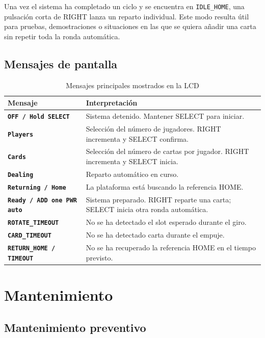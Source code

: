 \documentclass[a4paper, 11pt]{article}
\begin{document}
Una vez el sistema ha completado un ciclo y se encuentra en \texttt{IDLE\_HOME}, una pulsación corta de RIGHT lanza un reparto individual. Este modo resulta útil para pruebas, demostraciones o situaciones en las que se quiera añadir una carta sin repetir toda la ronda automática.

\subsection{Mensajes de pantalla}

\begin{table}[H]
\centering
\small
\begin{tabularx}{\textwidth}{>{\bfseries}p{}X}
\hline
\textbf{Mensaje} & \textbf{Interpretación} \\
\hline
\texttt{OFF / Hold SELECT} & Sistema detenido. Mantener SELECT para iniciar. \\
\texttt{Players} & Selección del número de jugadores. RIGHT incrementa y SELECT confirma. \\
\texttt{Cards} & Selección del número de cartas por jugador. RIGHT incrementa y SELECT inicia. \\
\texttt{Dealing} & Reparto automático en curso. \\
\texttt{Returning / Home} & La plataforma está buscando la referencia HOME. \\
\texttt{Ready / ADD one PWR auto} & Sistema preparado. RIGHT reparte una carta; SELECT inicia otra ronda automática. \\
\texttt{ROTATE\_TIMEOUT} & No se ha detectado el slot esperado durante el giro. \\
\texttt{CARD\_TIMEOUT} & No se ha detectado carta durante el empuje. \\
\texttt{RETURN\_HOME / TIMEOUT} & No se ha recuperado la referencia HOME en el tiempo previsto. \\
\hline
\end{tabularx}
\caption{Mensajes principales mostrados en la LCD}
\label{tab:manual_lcd_messages}
\end{table}

\section{Mantenimiento}

\subsection{Mantenimiento preventivo}
\end{document}

